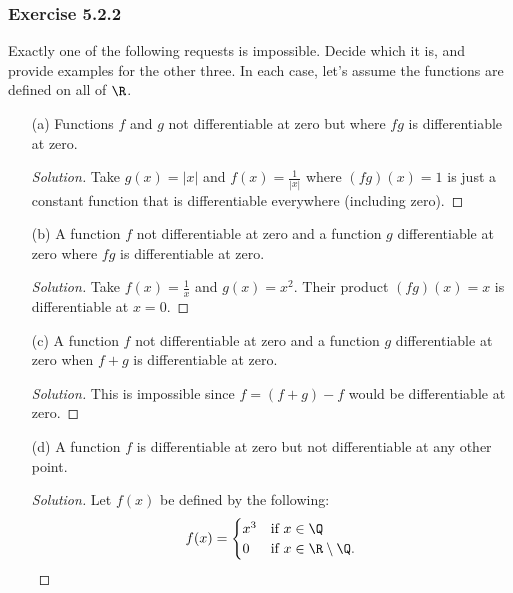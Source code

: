 \subsubsection{Exercise 5.2.2} Exactly one of the following requests is impossible. Decide which it is, and provide examples for the other three. In each case, let's assume the functions are defined on all of \( \R  \).

\begin{enumerate}
    \item[(a)] Functions \( f  \) and \( g  \) not differentiable at zero but where \( fg \) is differentiable at zero.
        \begin{proof}[Solution]
        Take \( g(x) = | x |  \) and \( f(x) = \frac{ 1 }{ | x |  }  \) where \( (fg)(x) = 1  \) is just a constant function that is differentiable everywhere (including zero).
        \end{proof}
    \item[(b)] A function \( f  \) not differentiable at zero and a function \( g  \) differentiable at zero where \( fg  \) is differentiable at zero.
        \begin{proof}[Solution]
        Take \( f(x) = \frac{ 1 }{ x }   \) and \( g(x) = x^2  \). Their product \( (fg)(x) = x  \) is differentiable at \( x = 0  \).
        \end{proof}
    \item[(c)] A function \( f  \) not differentiable at zero and a function \( g  \) differentiable at zero when \( f + g  \) is differentiable at zero.
        \begin{proof}[Solution]
        This is impossible since \( f = (f+g) - f   \) would be differentiable at zero.
        \end{proof}
    \item[(d)] A function \( f  \) is differentiable at zero but not differentiable at any other point.
        \begin{proof}[Solution]
        Let \( f(x)  \) be defined by the following:
        \[ f(x) = 
        \begin{cases}
            x^3 &\text{if } x \in \Q \\ 
            0 &\text{if } x \in \R \setminus \Q.
        \end{cases} \]
        \end{proof}
\end{enumerate}

